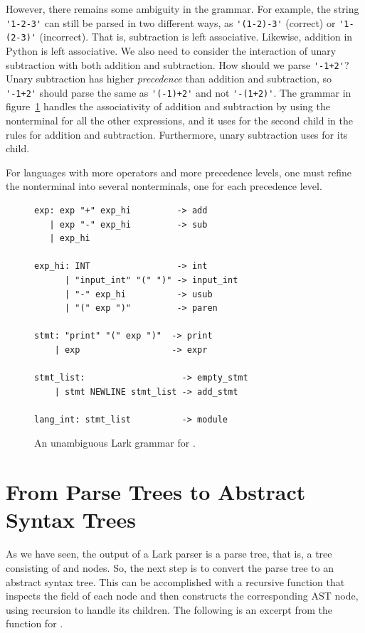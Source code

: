 \documentclass[7x10]{TimesAPriori_MIT}%
\numberwithin{theorem}{chapter}
\numberwithin{definition}{chapter}
\numberwithin{equation}{chapter}
\begin{document}
{However, there remains some ambiguity in the grammar. For example, the
string \lstinline{'1-2-3'} can still be parsed in two different ways,
as \lstinline{'(1-2)-3'} (correct) or \lstinline{'1-(2-3)'}
(incorrect).  That is, subtraction is left associative. Likewise,
addition in Python is left associative. We also need to consider the
interaction of unary subtraction with both addition and
subtraction. How should we parse \lstinline{'-1+2'}? Unary subtraction
has higher \emph{precedence} than addition
and subtraction, so \lstinline{'-1+2'} should parse the same as
\lstinline{'(-1)+2'} and not \lstinline{'-(1+2)'}. The grammar in
figure~\ref{fig:Lint-lark-grammar} handles the associativity of
addition and subtraction by using the nonterminal  for
all the other expressions, and it uses  for the second
child in the rules for addition and subtraction. Furthermore, unary
subtraction uses  for its child.

For languages with more operators and more precedence levels, one must
refine the  nonterminal into several nonterminals, one for
each precedence level.

\begin{figure}[tbp]
\begin{tcolorbox}[colback=white]
\centering
\begin{lstlisting}[escapechar=$]
exp: exp "+" exp_hi         -> add
   | exp "-" exp_hi         -> sub
   | exp_hi

exp_hi: INT                 -> int
      | "input_int" "(" ")" -> input_int
      | "-" exp_hi          -> usub
      | "(" exp ")"         -> paren

stmt: "print" "(" exp ")"  -> print
    | exp                  -> expr

stmt_list:                   -> empty_stmt
    | stmt NEWLINE stmt_list -> add_stmt

lang_int: stmt_list          -> module
\end{lstlisting}
\end{tcolorbox}
\caption{An unambiguous Lark grammar for \LangInt{}.}
\label{fig:Lint-lark-grammar}
\end{figure}

\section{From Parse Trees to Abstract Syntax Trees}

As we have seen, the output of a Lark parser is a parse tree, that is,
a tree consisting of  and  nodes. So, the next
step is to convert the parse tree to an abstract syntax tree. This can
be accomplished with a recursive function that inspects the
 field of each node and then constructs the corresponding
AST node, using recursion to handle its children. The following is an
excerpt from the  function for \LangInt{}.

}
\end{document}
